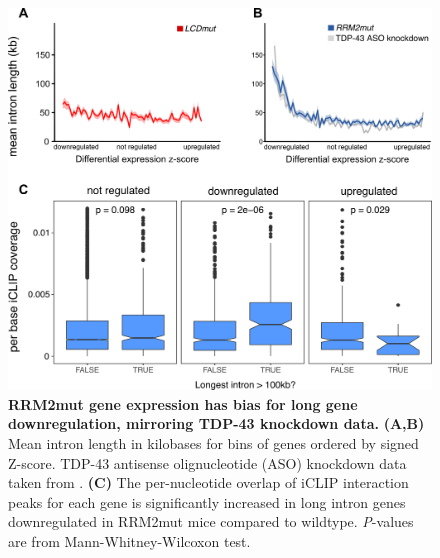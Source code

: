 \begin{figure}[h]
	\centering
	\includegraphics[width=12cm]{Figures/05_tdp_mice/long_genes_multi.png}
	\caption[RRM2mut gene expression has bias for long gene downregulation]{
		\textbf{RRM2mut gene expression has bias for long gene downregulation, mirroring TDP-43 knockdown data.}
	\textbf{(A,B)} Mean intron length in kilobases for bins of genes ordered by signed Z-score. TDP-43 antisense olignucleotide (ASO) knockdown data taken from \cite{Polymenidou2011-hs}. \textbf{(C)} The per-nucleotide overlap of iCLIP interaction peaks for each gene is significantly increased in long intron genes downregulated in RRM2mut mice compared to wildtype. \textit{P}-values are from Mann-Whitney-Wilcoxon test.
}
	\label{fig:long_genes}
\end{figure}

